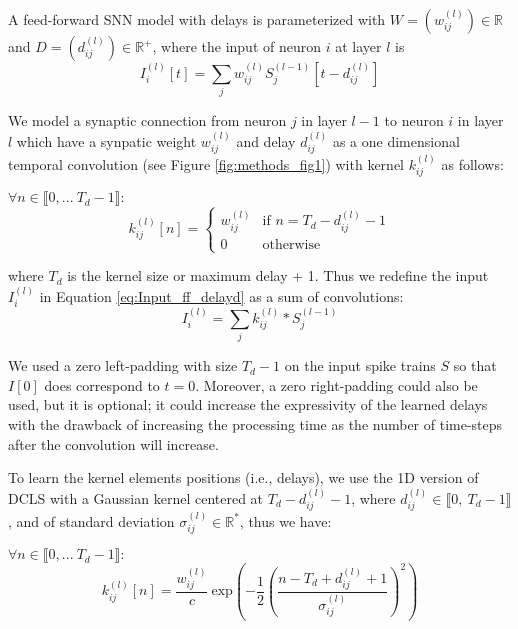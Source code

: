 \documentclass{article} \usepackage{iclr2024_conference,times}
\begin{document}
A feed-forward SNN model with delays is parameterized with $W = (w_{ij}^{(l)}) \in \mathbb{R}$ and $D = (d_{ij}^{(l)}) \in \mathbb{R}^+$, where the input of neuron $i$ at layer $l$ is 
\begin{equation}
    I_i^{(l)}[t] =  \sum_{j} w_{ij}^{(l)} S_j^{(l-1)}[t-d_{ij}^{(l)}]
    \label{eq:Input_ff_delayd}
\end{equation}

We model a synaptic connection from neuron $j$ in layer $l-1$ to neuron $i$ in layer $l$ which have a synpatic weight $w_{ij}^{(l)}$ and delay $d_{ij}^{(l)}$ as a one dimensional temporal convolution (see Figure \ref{fig:methods_fig1}) with kernel $k_{ij}^{(l)}$ as follows:

$\forall n \in \llbracket 0, ... \ T_d-1 \rrbracket  \colon$
\begin{equation}
k_{ij}^{(l)}[n] =
\begin{cases}
 w_{ij}^{(l)} & \text{if } n = T_d - d_{ij}^{(l)} - 1  \\
 0 & \text{otherwise}
\end{cases}
\label{eq:discrete_delays}
\end{equation}



where $T_d$ is the kernel size or maximum delay + 1. Thus we redefine the input $I_i^{(l)}$ in Equation \ref{eq:Input_ff_delayd} as a sum of convolutions:
\begin{equation}
I_i^{(l)} =  \sum_{j} k_{ij}^{(l)} \ast S_j^{(l-1)}
\end{equation}

We used a zero left-padding with size $T_d-1$ on the input spike trains $S$ so that $I[0]$ does correspond to $t=0$. Moreover, a zero right-padding could also be used, but it is optional; it could increase the expressivity of the learned delays with the drawback of increasing the processing time as the number of time-steps after the convolution will increase.




To learn the kernel elements positions (i.e., delays), we use the 1D version of DCLS \citep{hassani2023dilated}  with a Gaussian kernel \citep{khalfaouihassani2023dilated} centered at $T_d - d_{ij}^{(l)} -1$, where $d_{ij}^{(l)}\in \llbracket 0,\ T_d-1 \rrbracket$, and of standard deviation $\sigma_{ij}^{(l)} \in \mathbb{R^*}$, thus we have:

$\forall n \in \llbracket 0, ... \ T_d-1 \rrbracket  \colon$
\begin{equation}
    k_{ij}^{(l)}[n] = \frac{w_{ij}^{(l)}}{c} \ \text{exp} \left({- \frac{1}{2}\left(\frac{n - T_d + d_{ij}^{(l)} + 1 }{\sigma_{ij}^{(l)}} \right)^2} \right)
\end{equation}
\end{document}
